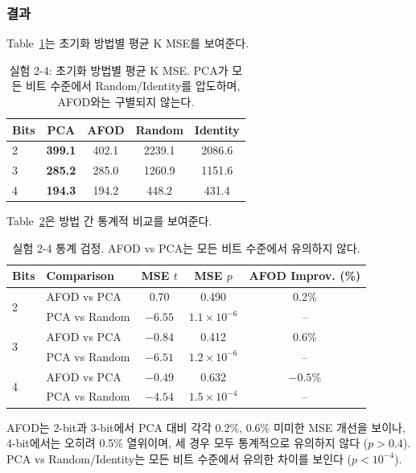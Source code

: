 \documentclass[11pt,a4paper]{article}
\begin{document}
\subsubsection{결과}

Table~\ref{tab:exp24_mse}는 초기화 방법별 평균 K MSE를 보여준다.

\begin{table}[H]
\centering
\caption{실험 2-4: 초기화 방법별 평균 K MSE. PCA가 모든 비트 수준에서 Random/Identity를 압도하며, AFOD와는 구별되지 않는다.}
\label{tab:exp24_mse}
\begin{tabular}{lcccc}
\toprule
\textbf{Bits} & \textbf{PCA} & \textbf{AFOD} & \textbf{Random} & \textbf{Identity} \\
\midrule
2 & \textbf{399.1} & 402.1 & 2239.1 & 2086.6 \\
3 & \textbf{285.2} & 285.0 & 1260.9 & 1151.6 \\
4 & \textbf{194.3} & 194.2 & 448.2 & 431.4 \\
\bottomrule
\end{tabular}
\end{table}

Table~\ref{tab:exp24_stat}은 방법 간 통계적 비교를 보여준다.

\begin{table}[H]
\centering
\caption{실험 2-4 통계 검정. AFOD vs PCA는 모든 비트 수준에서 유의하지 않다.}
\label{tab:exp24_stat}
\begin{tabular}{llccc}
\toprule
\textbf{Bits} & \textbf{Comparison} & \textbf{MSE $t$} & \textbf{MSE $p$} & \textbf{AFOD Improv. (\%)} \\
\midrule
\multirow{2}{*}{2} & AFOD vs PCA & 0.70 & 0.490 & 0.2\% \\
 & PCA vs Random & $-6.55$ & $1.1 \times 10^{-6}$ & -- \\
\midrule
\multirow{2}{*}{3} & AFOD vs PCA & $-0.84$ & 0.412 & 0.6\% \\
 & PCA vs Random & $-6.51$ & $1.2 \times 10^{-6}$ & -- \\
\midrule
\multirow{2}{*}{4} & AFOD vs PCA & $-0.49$ & 0.632 & $-0.5$\% \\
 & PCA vs Random & $-4.54$ & $1.5 \times 10^{-4}$ & -- \\
\bottomrule
\end{tabular}
\end{table}

AFOD는 2-bit과 3-bit에서 PCA 대비 각각 0.2\%, 0.6\% 미미한 MSE 개선을 보이나, 4-bit에서는 오히려 0.5\% 열위이며, 세 경우 모두 통계적으로 유의하지 않다 ($p > 0.4$).
PCA vs Random/Identity는 모든 비트 수준에서 유의한 차이를 보인다 ($p < 10^{-4}$).
\end{document}
